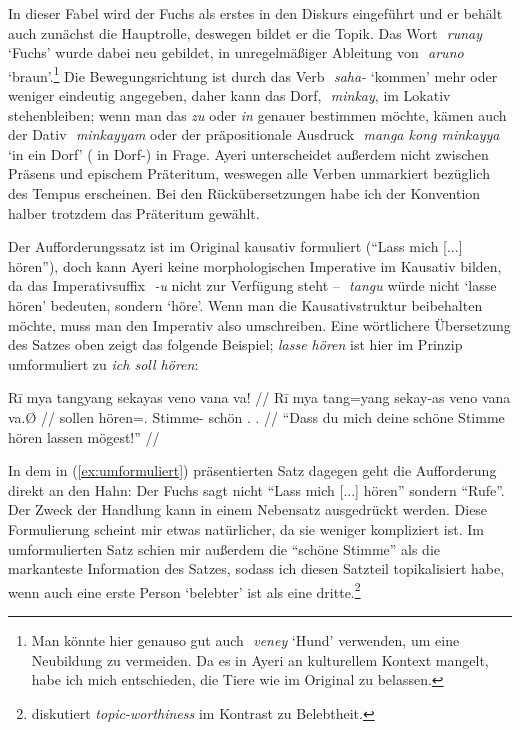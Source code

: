 \documentclass[12pt,paper=a4]{scrartcl}
\newcommand{\fw}[1]{\textit{#1}} %
\newcommand{\zwsp}{\mbox{​}} %
\newcommand{\rayr}[2]{\zwsp\smash{{\Tagati #1}} \emph{#2}} %
\newcommand{\xayr}[3]{\zwsp\smash{\Tagati #1} \emph{#2} `#3'} %
\begin{document}
\xe

In dieser Fabel wird der Fuchs als erstes in den Diskurs eingeführt und er behält auch zunächst die Hauptrolle, deswegen bildet er die Topik. Das Wort \xayr{runj}{runay}{Fuchs} wurde dabei neu gebildet, in unregelmäßiger Ableitung von \xayr{Aruno}{aruno}{braun}.\footnote{Man könnte hier genauso gut auch \xayr{venej}{veney}{Hund} verwenden, um eine Neubildung zu vermeiden. Da es in Ayeri an kulturellem Kontext mangelt, habe ich mich entschieden, die Tiere wie im Original zu belassen.} Die Bewegungsrichtung ist durch das Verb \xayr{sh/}{saha-}{kommen} mehr oder weniger eindeutig angegeben, daher kann das Dorf, \rayr{miMkj}{minkay}, im Lokativ stehenbleiben; wenn man das \fw{zu} oder \fw{in} genauer bestimmen möchte, kämen auch der Dativ \rayr{miMkjymF}{minkayyam} oder der präpositionale Ausdruck \xayr{mN koNF miMkjy}{manga kong minkayya}{in ein Dorf} (\Dyn{} in Dorf-\Loc{}) in Frage. Ayeri unterscheidet außerdem nicht zwischen Präsens und epischem Präteritum, weswegen alle Verben unmarkiert bezüglich des Tempus erscheinen. Bei den Rückübersetzungen habe ich der Konvention halber trotzdem das Präteritum gewählt.

Der Aufforderungssatz ist im Original kausativ formuliert (\enquote{Lass mich [...] hören}), doch kann Ayeri keine morphologischen Imperative im Kausativ bilden, da das Imperativsuffix \rayr{/U}{-u} nicht zur Verfügung steht -- \rayr{tNu}{tangu} würde nicht `lasse hören' bedeuten, sondern `höre'. Wenn man die Kausativstruktur beibehalten möchte, muss man den Imperativ also umschreiben. Eine wörtlichere Übersetzung des Satzes oben zeigt das folgende Beispiel; \fw{lasse hören} ist hier im Prinzip umformuliert zu \fw{ich soll hören}:

\exdisplay[everygl=\hspace*{1em}]\noexno
\begingl
	\gla Rī mya tangyang sekayas veno vana va! //
	\glb Rī mya tang=yang sekay-as veno vana va.Ø //
	\glc \CauT{} sollen hören=\Fsg{}.\Aarg{} Stimme-\Parg{} schön \Ssg{}.\Gen{} \Ssg{}.\Top{} //
	\glft \enquote{Dass du mich deine schöne Stimme hören lassen mögest!} //
\endgl
\xe

In dem in (\ref{ex:umformuliert}) präsentierten Satz dagegen geht die Aufforderung direkt an den Hahn: Der Fuchs sagt nicht \enquote{Lass mich [...] hören} sondern \enquote{Rufe}. Der Zweck der Handlung kann in einem Nebensatz ausgedrückt werden. Diese Formulierung scheint mir etwas natürlicher, da sie weniger kompliziert ist. Im umformulierten Satz schien mir außerdem die \enquote{schöne Stimme} als die markanteste Information des Satzes, sodass ich diesen Satzteil topikalisiert habe, wenn auch eine erste Person \enquote*{belebter} ist als eine dritte.\footnote{\textcite[197--199]{comrie1989} diskutiert \fw{topic-worthiness} im Kontrast zu Belebtheit.}
\end{document}
